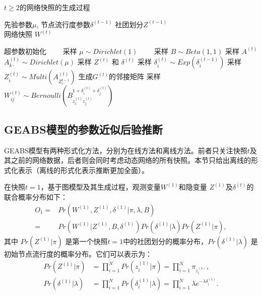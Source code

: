 \begin{algorithm}[H]
\caption{$t \ge 2$的网络快照的生成过程}\label{gent2}
\algorithmicrequire \; 先验参数$\mu$, 节点流行度参数$\delta^{(t-1)}$ 社团划分$Z^{(t-1)}$ \\
\algorithmicensure \; 网络快照 $W^{(t)}$
\begin{algorithmic}[1]
\STATE 超参数初始化
\STATE ~~~~采样 $\mu \sim Dirichlet (1)$ 
\STATE ~~~~采样 $B \sim Beta(1,1)$
\STATE 采样 $A^{(t)}$
\STATE $A^{(t)}_{k\cdot} \sim Dirichlet(\mu)$
\ENDFOR
\STATE 采样 $Z^{(t)}$ 和 $\delta^{(t)}$
\STATE 采样 $\delta^{(t)}_i \sim Exp(\delta^{(t-1)}_i)$
\STATE 采样 $Z^{(t)}_i \sim Multi(A^{(t)}_{Z_i^{t-1}})$
\ENDFOR
\STATE 生成$G^{(t)}的邻接矩阵$
\STATE 采样 $W^{(t)}_{ij} \sim Bernoulli(B_{z_i^{(t)} z_j^{(t)}}^{1+\delta_i^{(t)} + \delta_j^{(t)}})$
\ENDFOR
\end{algorithmic}
\end{algorithm}

\subsection{GEABS模型的参数近似后验推断}



GEABS模型有两种形式化方法，分别为在线方法和离线方法。前者只关注快照$t$及其之前的网络数据，后者则会同时考虑动态网络的所有快照。本节只给出离线的形式化表示（离线的形式化表示推断更加全面）。

在快照$t=1$，基于图模型及其生成过程，观测变量$W^{(1)}$和隐变量 $Z^{(1)}$及$\delta^{(t)}$的联合概率分布如下：
\begin{align}
O_1 = & Pr(W^{(1)}, Z^{(1)}, \delta^{(1)} |\pi, \lambda, B) \nonumber\\
= & Pr(W^{(1)}|Z^{(1)},B,\delta^{(1)})  Pr(\delta^{(1)}|\lambda) Pr(Z^{(1)}|\pi),
\label{eq:O1}
\end{align}
其中 $Pr(Z^{(1)} | \pi)$ 是第一个快照$t=1$中的社团划分的概率分布，$Pr(\delta^{(1)} | \lambda)$ 是初始节点流行度的概率分布。它们可以表示为：
\begin{align}
Pr (Z^{(1)}|\pi) &= \prod_{i=1}^{N} Pr(z_i^{(1)}|\pi) = \prod_{i=1}^{N} \pi_{z_i^{(1)}}, 
\label{eq:O6}\\
Pr (\delta^{(1)}|\lambda)  &= \prod_{i=1}^{N} Pr(\delta_i^{(1)}|\lambda)
 = \prod_{i=1}^{N} \lambda e^{-\lambda \delta_i^{(1)}}. 
\label{eq:O7}
\end{align}

